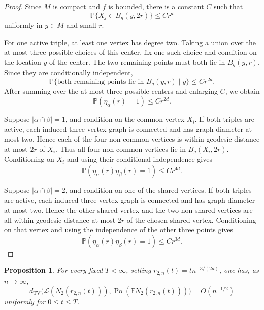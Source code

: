 \documentclass[11pt]{article}
\newtheorem{proposition}[theorem]{Proposition}
\theoremstyle{remark}
\newcommand{\E}{\mathbb E}
\newcommand{\Pp}{\mathbb P}
\numberwithin{equation}{section}
\begin{document}
\begin{proof}
Since $M$ is compact and $f$ is bounded, there is a constant $C$ such that
\[
\Pp\{X_j\in B_g(y,2r)\}\le Cr^d
\]
uniformly in $y\in M$ and small $r$.

For one active triple, at least one vertex has degree two.  Taking a union
over the at most three possible choices of this center, fix one such choice
and condition on the location $y$ of the center.  The two remaining points
must both lie in $B_g(y,r)$.  Since they are conditionally independent,
\[
\Pp\{\text{both remaining points lie in }B_g(y,r)\mid y\}
\le C r^{2d}.
\]
After summing over the at most three possible centers and enlarging $C$,
we obtain
\[
\Pp(\eta_\alpha(r)=1)\le Cr^{2d}.
\]

Suppose $|\alpha\cap\beta|=1$, and condition on the common vertex $X_i$.
If both triples are active, each induced three-vertex graph is connected and
has graph diameter at most two.  Hence each of the four non-common vertices is
within geodesic distance at most $2r$ of $X_i$.  Thus all four non-common
vertices lie in $B_g(X_i,2r)$.  Conditioning on $X_i$ and using their
conditional independence gives
\[
\Pp(\eta_\alpha(r)\eta_\beta(r)=1)\le Cr^{4d}.
\]

Suppose $|\alpha\cap\beta|=2$, and condition on one of the shared vertices.
If both triples are active, each induced three-vertex graph is connected and
has graph diameter at most two.  Hence the other shared vertex and the two
non-shared vertices are all within geodesic distance at most $2r$ of the
chosen shared vertex.  Conditioning on that vertex and using the independence
of the other three points gives
\[
\Pp(\eta_\alpha(r)\eta_\beta(r)=1)\le Cr^{3d}.
\]
\end{proof}

\begin{proposition}\label{prop:N2-poisson}
For every fixed $T<\infty$, setting $r_{2,n}(t)=tn^{-3/(2d)}$, one has, as
$n\to\infty$,
\[
d_{\mathrm{TV}}\bigl(\mathcal L(N_2(r_{2,n}(t))),
\operatorname{Po}(\E N_2(r_{2,n}(t)))\bigr)=O(n^{-1/2})
\]
uniformly for $0\le t\le T$.
\end{proposition}
\end{document}
